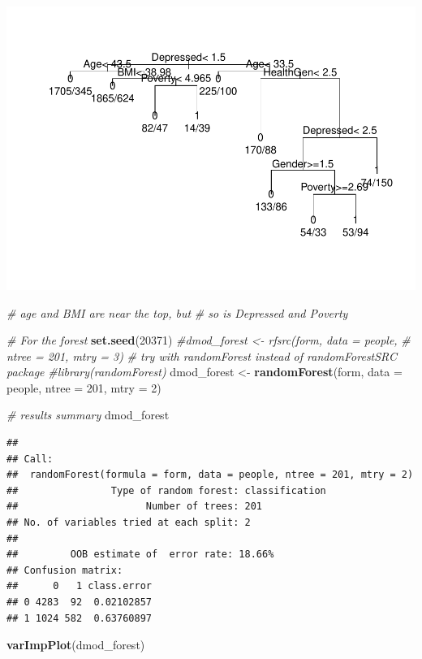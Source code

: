 \documentclass[]{article}
\newenvironment{Shaded}{\begin{snugshade}}{\end{snugshade}}
\newcommand{\KeywordTok}[1]{\textcolor[rgb]{0.13,0.29,0.53}{\textbf{{#1}}}}
\newcommand{\DataTypeTok}[1]{\textcolor[rgb]{0.13,0.29,0.53}{{#1}}}
\newcommand{\DecValTok}[1]{\textcolor[rgb]{0.00,0.00,0.81}{{#1}}}
\newcommand{\StringTok}[1]{\textcolor[rgb]{0.31,0.60,0.02}{{#1}}}
\newcommand{\CommentTok}[1]{\textcolor[rgb]{0.56,0.35,0.01}{\textit{{#1}}}}
\newcommand{\NormalTok}[1]{{#1}}
\begin{document}
\includegraphics{Hmwk7AnswerKey_files/figure-latex/unnamed-chunk-13-1.pdf}

\begin{Shaded}
\begin{Highlighting}[]
\CommentTok{# age and BMI are near the top, but }
\CommentTok{# so is Depressed and Poverty}


\CommentTok{# For the forest}
\KeywordTok{set.seed}\NormalTok{(}\DecValTok{20371}\NormalTok{)}
\CommentTok{#dmod_forest <- rfsrc(form, data = people, }
\CommentTok{#                     ntree = 201, mtry = 3)}
\CommentTok{# try with randomForest instead of randomForestSRC package}
\CommentTok{#library(randomForest)}
\NormalTok{dmod_forest <-}\StringTok{ }\KeywordTok{randomForest}\NormalTok{(form, }\DataTypeTok{data =} \NormalTok{people, }
                     \DataTypeTok{ntree =} \DecValTok{201}\NormalTok{, }\DataTypeTok{mtry =} \DecValTok{2}\NormalTok{)}

\CommentTok{# results summary}
\NormalTok{dmod_forest}
\end{Highlighting}
\end{Shaded}

\begin{verbatim}
## 
## Call:
##  randomForest(formula = form, data = people, ntree = 201, mtry = 2) 
##                Type of random forest: classification
##                      Number of trees: 201
## No. of variables tried at each split: 2
## 
##         OOB estimate of  error rate: 18.66%
## Confusion matrix:
##      0   1 class.error
## 0 4283  92  0.02102857
## 1 1024 582  0.63760897
\end{verbatim}

\begin{Shaded}
\begin{Highlighting}[]
\KeywordTok{varImpPlot}\NormalTok{(dmod_forest)}
\end{Highlighting}
\end{Shaded}
\end{document}
